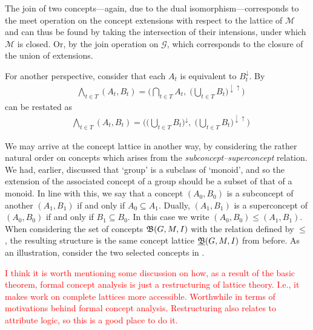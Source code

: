 The join of two concepts---again, due to the dual isomorphism---corresponds to the meet operation on the concept
extensions with respect to the lattice of $\mathcal{M}$ and can thus be found by taking the intersection of their
intensions, under which $\mathcal{M}$ is closed. Or, by the join operation on $\mathcal{G}$, which corresponds to the
closure of the union of extensions.

For another perspective, consider that each $A_{t}$ is equivalent to $B_{t}^{\downarrow}$. By
\begin{align*}
	 & \underset{t \in T}\bigwedge (A_{t}, B_{t}) = \Big( \underset{t \in T}\bigcap A_{t}, \; \big(\underset{t \in T}\bigcup B_{t}\big)^{\downarrow \uparrow}\Big)
\end{align*}
can be restated as
\begin{align*}
	 & \underset{t \in T}\bigwedge (A_{t}, B_{t}) = \Big(\big(\underset{t \in T}\bigcup B_{t}\big)^{\downarrow}, \; \big(\underset{t \in T}\bigcup B_{t}\big)^{\downarrow \uparrow}\Big)
\end{align*}

We may arrive at the concept lattice in another way, by considering the rather natural order on concepts which arises
from the \textit{subconcept--superconcept} relation. We had, earlier, discussed that `group' is a subclass of `monoid', and
so the extension of the associated concept of a group should be a subset of that of a monoid. In line with this, we say that
a concept $(A_{0},B_{0})$ is a subconcept of another $(A_{1},B_{1})$ if and only if $A_{0}\subseteq A_{1}$. Dually, $(A_{1}
,B_{1})$ is a superconcept of $(A_{0},B_{0})$ if and only if $B_{1}\subseteq B_{0}$. In this case we write
$(A_{0},B_{0}) \leq (A_{1},B_{1})$. When considering the set of concepts ${\mathfrak B} (G,M,\mathrel{I})$ with the relation defined by $\leq$,
the resulting structure is the same concept lattice $\underline{{\mathfrak B}} (G,M,\mathrel{I})$ from before. As an illustration, consider the two selected
concepts in .

\textcolor{red}{I think it is worth mentioning some discussion on how, as a result of the basic theorem, formal concept
analysis is just a restructuring of lattice theory. I.e., it makes work on complete lattices more accessible. Worthwhile
in terms of motivations behind formal concept analysis. Restructuring also relates to attribute logic, so this is a good
place to do it. }

